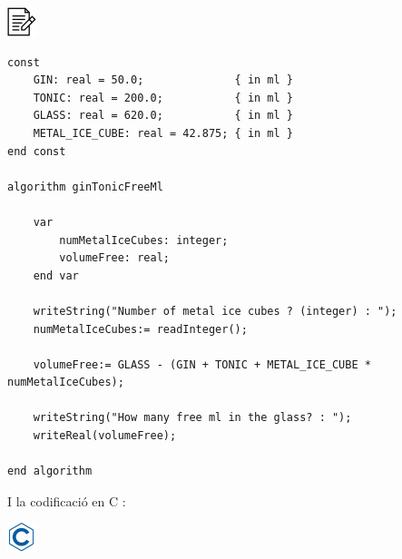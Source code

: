\documentclass[]{book}
\newenvironment{Shaded}{\begin{snugshade}}{\end{snugshade}}
\newcommand{\DataTypeTok}[1]{\textcolor[rgb]{0.13,0.29,0.53}{#1}}
\newcommand{\DecValTok}[1]{\textcolor[rgb]{0.00,0.00,0.81}{#1}}
\newcommand{\SpecialCharTok}[1]{\textcolor[rgb]{0.00,0.00,0.00}{#1}}
\newcommand{\StringTok}[1]{\textcolor[rgb]{0.31,0.60,0.02}{#1}}
\newcommand{\ImportTok}[1]{#1}
\newcommand{\CommentTok}[1]{\textcolor[rgb]{0.56,0.35,0.01}{\textit{#1}}}
\newcommand{\ControlFlowTok}[1]{\textcolor[rgb]{0.13,0.29,0.53}{\textbf{#1}}}
\newcommand{\PreprocessorTok}[1]{\textcolor[rgb]{0.56,0.35,0.01}{\textit{#1}}}
\newcommand{\NormalTok}[1]{#1}
\begin{document}
\includegraphics{./img/alg.png}

\begin{verbatim}
const
    GIN: real = 50.0;              { in ml }
    TONIC: real = 200.0;           { in ml }
    GLASS: real = 620.0;           { in ml }
    METAL_ICE_CUBE: real = 42.875; { in ml }
end const

algorithm ginTonicFreeMl

    var
        numMetalIceCubes: integer;
        volumeFree: real;
    end var

    writeString("Number of metal ice cubes ? (integer) : ");
    numMetalIceCubes:= readInteger();

    volumeFree:= GLASS - (GIN + TONIC + METAL_ICE_CUBE * numMetalIceCubes);

    writeString("How many free ml in the glass? : ");
    writeReal(volumeFree);

end algorithm
\end{verbatim}

I la codificació en C :

\includegraphics{./img/c.png}

\begin{Shaded}
\end{Shaded}
\end{document}
